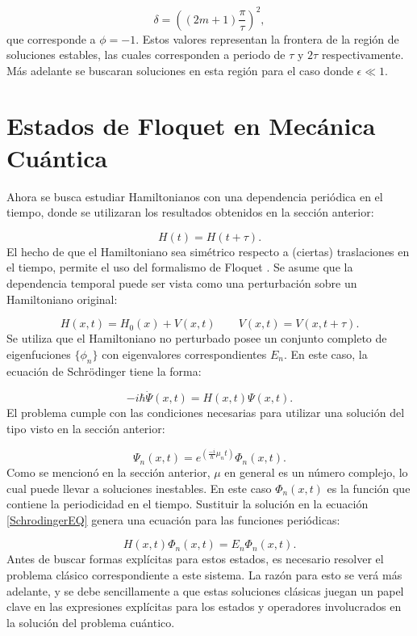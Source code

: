 \documentclass[a4paper,10pt]{report}
\begin{document}
\begin{equation}
\delta = ((2m+1)\frac{\pi}{\tau})^2,
\end{equation} que corresponde a $\phi=-1$. Estos valores representan la frontera de la región de soluciones estables, las cuales corresponden a periodo de $\tau$ y $2\tau$ respectivamente. Más adelante se buscaran soluciones en esta región para el caso donde $\epsilon \ll 1$.


\section{Estados de Floquet en Mecánica Cuántica}

Ahora se busca estudiar Hamiltonianos con una dependencia periódica en el tiempo, donde se utilizaran los resultados obtenidos en la sección anterior:

\begin{equation}
H(t)=H(t+\tau).
\end{equation} El hecho de que el Hamiltoniano sea simétrico respecto a (ciertas) traslaciones en el tiempo, permite el uso del formalismo de Floquet \cite{HanngiDQS}. Se asume que la dependencia temporal puede ser vista como una perturbación sobre un Hamiltoniano original:

\begin{equation}
H(x,t)=H_0(x)+V(x,t) \qquad V(x,t)=V(x,t+\tau).
\end{equation} Se utiliza que el Hamiltoniano no perturbado posee un conjunto completo de eigenfuciones $\{\phi_n\}$ con eigenvalores correspondientes $E_n$. En este caso, la ecuación de Schr\"{o}dinger tiene la forma:

\begin{equation}\label{SchrodingerEQ}
-i\hbar\dot{\Psi}(x,t) = H(x,t)\Psi(x,t).
\end{equation} El problema cumple con las condiciones necesarias para utilizar una solución del tipo visto en la sección anterior:

\begin{equation}
\Psi_n(x,t) = e^{(\frac{-i}{\hbar}\mu_nt)}\Phi_n(x,t).
\end{equation} Como se mencionó en la sección anterior, $\mu$ en general es un número complejo, lo cual puede llevar a soluciones inestables. En este caso $\Phi_n(x,t)$ es la función que contiene la periodicidad en el tiempo. Sustituir la solución en la ecuación \ref{SchrodingerEQ} genera una ecuación para las funciones periódicas:

\begin{equation}
H(x,t)\Phi_n(x,t)=E_n\Phi_n(x,t).
\end{equation} Antes de buscar formas explícitas para estos estados, es necesario resolver el problema clásico correspondiente a este sistema. La razón para esto se verá más adelante, y se debe sencillamente a que estas soluciones clásicas juegan un papel clave en las expresiones explícitas para los estados y operadores involucrados en la solución del problema cuántico.
\end{document}
